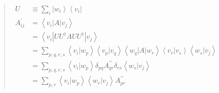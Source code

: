 \documentclass[UTF8]{ctexart}
\begin{document}
\begin{quote}
$\begin{aligned} U & \equiv \sum_{i}\left|w_{i}\right\rangle\left\langle v_{i}\right| \\ A_{i j}^{\prime} &=\left\langle v_{i}|A| v_{j}\right\rangle \\ &=\left\langle v_{i}\left|U U^{\dagger} A UU^{\dagger}\right| v_{j}\right\rangle \\ &=\sum_{p, q, r, s}\left\langle v_{i} | w_{p}\right\rangle\left\langle v_{p} | v_{q}\right\rangle\left\langle w_{q}|A| w_{r}\right\rangle\left\langle v_{r} | v_{s}\right\rangle\left\langle w_{s} | v_{j}\right\rangle \\ &=\sum_{p, q, r, s}\left\langle v_{i} | w_{p}\right\rangle \delta_{p q} A_{q r}^{\prime \prime} \delta_{r s}\left\langle w_{s} | v_{j}\right\rangle \\ &=\sum_{p, r}\left\langle v_{i} | w_{p}\right\rangle\left\langle w_{r} | v_{j}\right\rangle A_{p r}^{\prime \prime} \end{aligned}$















	
	
	
	
\end{quote}
\end{document}
